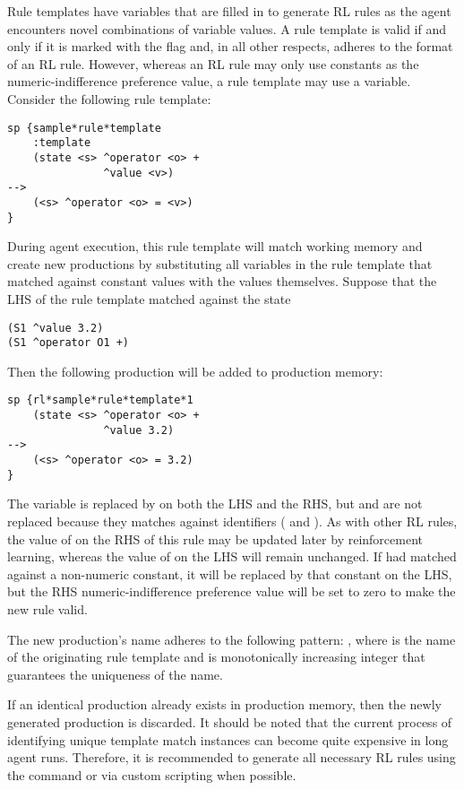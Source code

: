 Rule templates have variables that are filled in to generate RL rules as the agent encounters novel combinations of variable values.
A rule template is valid if and only if it is marked with the  flag and, in all other respects, adheres to the format of an RL rule.
However, whereas an RL rule may only use constants as the numeric-indifference preference value, a rule template may use a variable.
Consider the following rule template:

\begin{verbatim}
sp {sample*rule*template
    :template
    (state <s> ^operator <o> +
               ^value <v>)
-->
    (<s> ^operator <o> = <v>)
}
\end{verbatim}

During agent execution, this rule template will match working memory and create new productions by substituting all variables in the rule template that matched against constant values with the values themselves.
Suppose that the LHS of the rule template matched against the state

\begin{verbatim}
(S1 ^value 3.2)
(S1 ^operator O1 +)
\end{verbatim}

Then the following production will be added to production memory:

\begin{verbatim}
sp {rl*sample*rule*template*1
    (state <s> ^operator <o> +
               ^value 3.2)
-->
    (<s> ^operator <o> = 3.2)
}
\end{verbatim}

The variable  is replaced by  on both the LHS and the RHS, but  and  are not replaced because they matches against identifiers ( and ).
As with other RL rules, the value of  on the RHS of this rule may be updated later by reinforcement learning, whereas the value of  on the LHS will remain unchanged.
If  had matched against a non-numeric constant, it will be replaced by that constant on the LHS, but the RHS numeric-indifference preference value will be set to zero to make the new rule valid.

The new production's name adheres to the following pattern:
, where  is the name of the originating rule template and  is monotonically increasing integer that guarantees the uniqueness of the name.

If an identical production already exists in production memory, then the newly generated production is discarded.
It should be noted that the current process of identifying unique template match instances can become quite expensive in long agent runs.
Therefore, it is recommended to generate all necessary RL rules using the  command or via custom scripting when possible.

